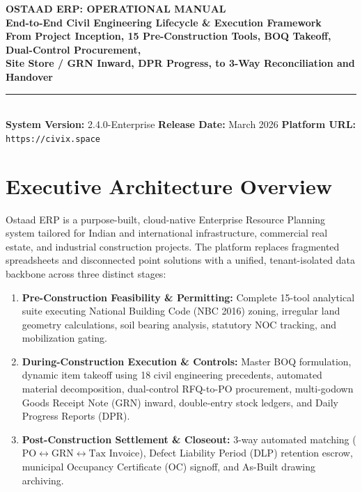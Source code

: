 \documentclass[11pt,a4paper]{article}
\begin{document}
\begin{center}
    {\Huge \textbf{\textcolor{primarynavy}{OSTAAD ERP: OPERATIONAL MANUAL}}}\\[0.3em]
    {\Large \textbf{\textcolor{brandblue}{End-to-End Civil Engineering Lifecycle \& Execution Framework}}}\\[0.6em]
    {\normalsize \textbf{From Project Inception, 15 Pre-Construction Tools, BOQ Takeoff, Dual-Control Procurement,}}\\[0.2em]
    {\normalsize \textbf{Site Store / GRN Inward, DPR Progress, to 3-Way Reconciliation and Handover}}\\[1.2em]
    \rule{\textwidth}{1.2pt}\\[0.6em]
    \textbf{System Version:} 2.4.0-Enterprise \quad\textbar\quad 
    \textbf{Release Date:} March 2026 \quad\textbar\quad 
    \textbf{Platform URL:} \texttt{https://civix.space}
\end{center}

\vspace{0.8em}

\section{Executive Architecture Overview}

Ostaad ERP is a purpose-built, cloud-native Enterprise Resource Planning system tailored for Indian and international infrastructure, commercial real estate, and industrial construction projects. The platform replaces fragmented spreadsheets and disconnected point solutions with a unified, tenant-isolated data backbone across three distinct stages:

\begin{enumerate}[leftmargin=*]
    \item \textbf{Pre-Construction Feasibility \& Permitting:} Complete 15-tool analytical suite executing National Building Code (NBC 2016) zoning, irregular land geometry calculations, soil bearing analysis, statutory NOC tracking, and mobilization gating.
    \item \textbf{During-Construction Execution \& Controls:} Master BOQ formulation, dynamic item takeoff using 18 civil engineering precedents, automated material decomposition, dual-control RFQ-to-PO procurement, multi-godown Goods Receipt Note (GRN) inward, double-entry stock ledgers, and Daily Progress Reports (DPR).
    \item \textbf{Post-Construction Settlement \& Closeout:} 3-way automated matching ($\text{PO} \leftrightarrow \text{GRN} \leftrightarrow \text{Tax Invoice}$), Defect Liability Period (DLP) retention escrow, municipal Occupancy Certificate (OC) signoff, and As-Built drawing archiving.
\end{enumerate}
\end{document}
